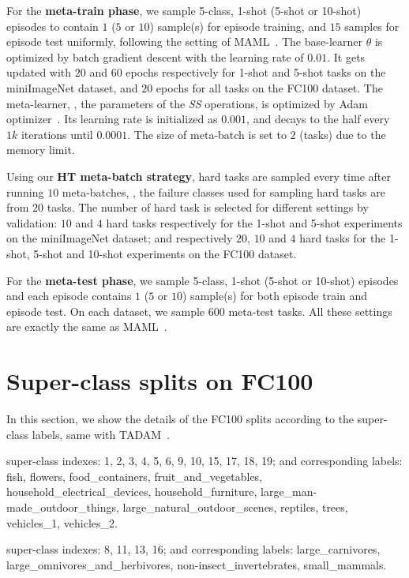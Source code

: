 For the \textbf{meta-train phase}, we sample 5-class, 1-shot (5-shot or 10-shot) episodes to contain $1$ ($5$ or $10$) sample(s) for episode training, and $15$ samples for episode test uniformly, following the setting of MAML~\cite{FinnAL17}. 
%
The base-learner $\theta$ is optimized by batch gradient descent with the learning rate of $0.01$. It gets updated with $20$ and $60$ epochs respectively for 1-shot and 5-shot tasks on the miniImageNet dataset, and $20$ epochs for all tasks on the FC100 dataset. 
%
The meta-learner, \ie, the parameters of the \emph{SS} operations, is optimized by Adam optimizer~\cite{kingma2014adam}.
%
Its learning rate is initialized as $0.001$, and decays to the half every $1k$ iterations until $0.0001$. 
The size of meta-batch is set to $2$ (tasks) due to the memory limit. 

Using our \textbf{HT meta-batch strategy}, hard tasks are sampled every time after running $10$ meta-batches, \ie, the failure classes used for sampling hard tasks are from $20$ tasks. The number of hard task is selected for different settings by validation: $10$ and $4$ hard tasks respectively for the 1-shot and 5-shot experiments on the miniImageNet dataset; and respectively $20$, $10$ and $4$ hard tasks for the 1-shot, 5-shot and 10-shot experiments on the FC100 dataset.



For the \textbf{meta-test phase}, we sample 5-class, 1-shot (5-shot or 10-shot) episodes and each episode contains $1$ ($5$ or $10$) sample(s) for both episode train and episode test. 
On each dataset, we sample $600$ meta-test tasks. All these settings are exactly the same as MAML~\cite{FinnAL17}. 




\section{Super-class splits on FC100}
\label{suppsec:fc100splits}
In this section, we show the details of the FC100 splits according to the super-class labels, same with TADAM~\cite{OreshkinNIPS18}.

super-class indexes: 1, 2, 3, 4, 5, 6, 9, 10, 15, 17, 18, 19; and
corresponding labels: fish, flowers, food\_containers, fruit\_and\_vegetables, household\_electrical\_devices, household\_furniture, large\_man-made\_outdoor\_things, large\_natural\_outdoor\_scenes, reptiles, trees, vehicles\_1, vehicles\_2.

super-class indexes: 8, 11, 13, 16; and
corresponding labels: large\_carnivores, large\_omnivores\_and\_herbivores, non-insect\_invertebrates, small\_mammals.


